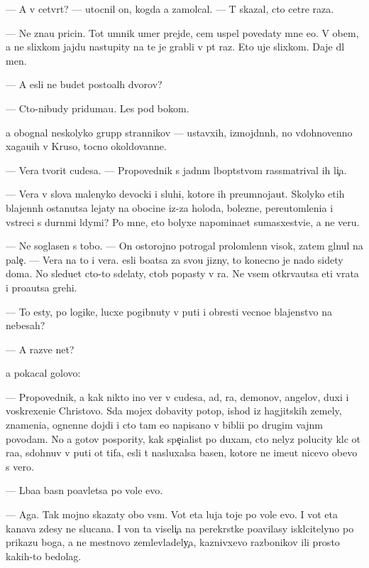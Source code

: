 \documentclass[10pt]{book}
\begin{document}
— A v cetv{\e}rt{\yi}{\y}? — utocnil on, kogda {\y}a zamolcal. — T{\yi} skazal, cto cet{\yi}re raza.

— Ne zna{\y}u pricin{\yi}. Tot umnik umer prejde, cem uspel povedaty mne {\y}e{\y}o. V ob{\x}em, {\y}a ne slixkom jajdu nastupity na te je grabli v p{\ia}t{\yi}{\y} raz. Eto uje slixkom. Daje dl{\ia} men{\ia}.

— A {\y}esli ne budet posto{\y}al{\yi}h dvorov?

— Cto-nibudy priduma{\y}u. Les pod bokom.

{\Y}a obognal neskolyko grupp strannikov — ustavxih, izmojd{\e}nn{\yi}h, no vdohnovenno xaga{\y}u{\x}ih v Kruso, tocno okoldovann{\yi}{\y}e.

— Vera tvorit cudesa. — Propovednik s jadn{\yi}m l{\iu}bop{\yi}tstvom rassmatrival ih li{\c}a.

— Vera v slova malenyko{\y} devocki i sluhi, kotor{\yi}{\y}e ih preumnoja{\y}ut. Skolyko etih blajenn{\yi}h ostanutsa lejaty na obocine iz-za holoda, bolezne{\y}, pereutomleni{\y}a i vstreci s durn{\yi}mi l{\iu}dymi? Po mne, eto bolyxe napomina{\y}et sumasxestvi{\y}e, a ne veru.

— Ne soglasen s tobo{\y}. — On ostorojno potrogal prolomlenn{\yi}{\y} visok, zatem gl{\ia}nul na pale{\c}. — Vera na to i vera. {\Y}esli bo{\y}atsa za svo{\y}u jizny, to konecno je nado sidety doma. No sledu{\y}et cto-to sdelaty, ctob{\yi} popasty v ra{\y}. Ne vsem otkr{\yi}va{\y}utsa eti vrata i pro{\x}a{\y}utsa grehi.

— To {\y}esty, po logike, lucxe pogibnuty v puti i obresti vecno{\y}e blajenstvo na nebesah?

— A razve net?

{\Y}a pokacal golovo{\y}:

— Propovednik, {\y}a kak nikto ino{\y} ver{\iu} v cudesa, ad, ra{\y}, demonov, angelov, duxi i voskrexeni{\y}e Christovo. S{\iu}da mojex dobavity potop, ishod iz hagjitskih zemely, znameni{\y}a, ognenn{\yi}{\y}e dojdi i cto tam {\y}e{\x}o napisano v bibli{\y}i po drugim vajn{\yi}m povodam. No {\y}a gotov pospority, kak spe{\c}ialist po duxam, cto nelyz{\ia} polucity kl{\iu}c ot ra{\y}a, sdohnuv v puti ot tifa, {\y}esli t{\yi} nasluxalsa basen, kotor{\yi}{\y}e ne ime{\y}ut nicevo ob{\x}evo s vero{\y}.

— L{\iu}ba{\y}a basn{\ia} po{\y}avl{\ia}{\y}etsa po vole {\Y}evo.

— Aga. Tak mojno skazaty obo vs{\e}m. Vot eta luja toje po vole {\y}evo. I vot eta kanava zdesy ne sluca{\y}na. I von ta viseli{\c}a na perekr{\e}stke po{\y}avilasy iskl{\iu}citelyno po prikazu boga, a ne mestnovo zemlevladely{\c}a, kaznivxevo razbo{\y}nikov ili prosto kakih-to bedolag.
\end{document}
